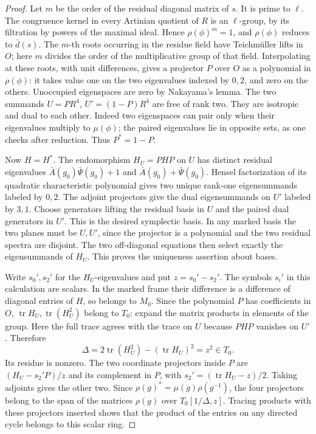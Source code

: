 \documentclass[a4paper,11pt]{article}
\theoremstyle{definition}
\theoremstyle{remark}
\numberwithin{equation}{section}
\begin{document}
\begin{proof}
Let \(m\) be the order of the residual diagonal matrix of \(s\).
It is prime to \(\ell\). The congruence kernel in every
Artinian quotient of \(R\) is an \(\ell\)-group, by its
filtration by powers of the maximal ideal. Hence
\(\rho(\phi)^m=1\), and \(\rho(\phi)\) reduces to \(\bar d(s)\).
The \(m\)-th roots occurring in the residue field have
Teichm\"uller lifts in \(O\); here \(m\) divides the order of the
multiplicative group of that field. Interpolating at these
roots, with unit differences, gives a projector \(P\) over \(O\)
as a polynomial in \(\rho(\phi)\): it takes value one on the
two eigenvalues indexed by \(0,2\), and zero on the others.
Unoccupied eigenspaces are zero by Nakayama's lemma. The two
summands \(U=P R^4\), \(U'=(1-P)R^4\) are free of rank two.
They are isotropic and dual to each other. Indeed two
eigenspaces can pair only when their eigenvalues multiply to
\(\mu(\phi)\); the paired eigenvalues lie in opposite sets, as
one checks after reduction. Thus \(P^*=1-P\).

Now \(H=H^*\). The endomorphism \(H_U=PHP\) on \(U\) has
distinct residual eigenvalues \(\bar A(g_0)\bar\Psi(g_0)+1\)
and \(\bar A(g_0)+\bar\Psi(g_0)\). Hensel factorization of
its quadratic characteristic polynomial gives two unique
rank-one eigensummands labeled by \(0,2\). The adjoint
projectors give the dual eigensummands on \(U'\) labeled by
\(3,1\). Choose generators lifting the residual basis in \(U\)
and the paired dual generators in \(U'\). This is the desired
symplectic basis. In any marked basis the two planes must be
\(U,U'\), since the projector is a polynomial and the two
residual spectra are disjoint. The two off-diagonal equations
then select exactly the eigensummands of \(H_U\). This proves
the uniqueness assertion about bases.

Write \(s_0',s_2'\) for the \(H_U\)-eigenvalues and put
\(z=s_0'-s_2'\). The symbols \(s_i'\) in this calculation are
scalars. In the marked frame their difference is a difference
of diagonal entries of \(H\), so belongs to \(M_0\).
Since the polynomial \(P\) has coefficients in \(O\),
\(\operatorname{tr}H_U,\operatorname{tr}(H_U^2)\) belong to
\(T_0\): expand the matrix products in elements of the group.
Here the full trace agrees with the trace on \(U\) because
\(PHP\) vanishes on \(U'\). Therefore
\[
             \Delta=2\operatorname{tr}(H_U^2)
                        -(\operatorname{tr}H_U)^2=z^2\in T_0 .
\]
Its residue is nonzero. The two coordinate projectors inside
\(P\) are \((H_U-s_2'P)/z\) and its complement in \(P\), with
\(s_2'=(\operatorname{tr}H_U-z)/2\). Taking adjoints gives the
other two. Since \(\rho(g)^*=\mu(g)\rho(g^{-1})\), the four
projectors belong to the span of the matrices \(\rho(g)\)
over \(T_0[1/\Delta,z]\). Tracing products with these projectors
inserted shows that the product of the entries on any directed
cycle belongs to this scalar ring.


\end{proof}
\end{document}
